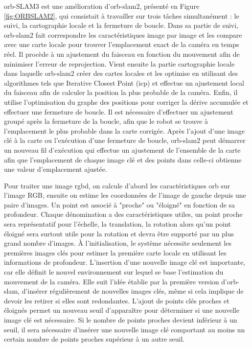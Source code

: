 \documentclass[11pt]{article}
\begin{document}
  \acrshort{orb}-SLAM3 \cite{camposORBSLAM3AccurateOpenSource2021} est une amélioration d'\acrshort{orb}-\acrshort{slam}2, présenté en Figure \ref{fig:ORBSLAM2}, qui consistait à travailler sur trois tâches simultanément : 
  le suivi, la cartographie locale et la fermeture de boucle. Dans sa partie de suivi, \acrshort{orb}-\acrshort{slam}2 fait correspondre les caractéristiques image 
  par image et les compare avec une carte locale pour trouver l'emplacement exact de la caméra en temps réel. Il procède à un ajustement 
  du faisceau en fonction du mouvement afin de minimiser l'erreur de reprojection. Vient ensuite la partie cartographie locale 
  dans laquelle \acrshort{orb}-\acrshort{slam}2 
  créer des cartes locales et les optimise en utilisant des algorithmes tels que Iterative Closest Point (\acrshort{icp}) et effectue un ajustement 
  local du faisceau afin de calculer la position la plus probable de la caméra. Enfin, il utilise l'optimisation du graphe des positions 
  pour corriger la dérive accumulée et effectuer une fermeture de boucle. Il est nécessaire d'effectuer un ajustement groupé
  après la fermeture de la boucle, afin que le robot se trouve à l'emplacement le plus probable dans la carte corrigée. 
  Après l'ajout d'une image clé à la carte ou l'exécution d'une fermeture de boucle, 
  \acrshort{orb}-\acrshort{slam}2 peut démarrer un nouveau fil d'exécution qui effectue un ajustement de l'ensemble de la carte afin que 
  l'emplacement de chaque image clé et des points dans celle-ci obtienne une valeur d'emplacement ajustée.

  Pour traiter une image \acrshort{rgbd}, on calcule d'abord les caractéristiques \acrshort{orb} sur l'image RGB, ensuite on estime les coordonnées de l'image de 
  gauche depuis une paire d'images. Un point est associé à "proche" ou "éloigné" en fonction de sa profondeur. Chaque dénomination a des
  caractéristiques utiles, un point proche sera représentatif pour l'échelle, la translation, la rotation alors qu'un point éloigné
  sera surtout utile pour la rotation et devra être supporté par un plus grand nombre d'images.
  À l'initialisation, le système nécessite seulement les premières images clés pour estimer la première carte locale en utilisant les informations
  de profondeur. 
  L'insertion d'une nouvelle image clé est importante, car elle définit le nouvel environnement sur lequel se base l'estimation du mouvement 
  de la caméra. Elle suit l'idée établie par la première version d'\acrshort{orb}-\acrshort{slam}, d'insérer régulièrement de nouvelles images clés, 
  même si cela implique de devoir les retirer si elles sont redondantes. L'ajout de points clés proches et éloignés permet un nouveau seuil 
  d'apparaître pour déterminer si une nouvelle image clé est nécessaire. 
  Si le nombre de points proches devient inférieur à un seuil, il sera nécessaire d'insérer une nouvelle image clé comportant au moins un certain
  nombre de points proches supérieur à un autre seuil.
\end{document}
